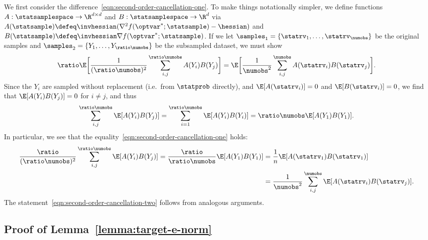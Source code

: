 \documentclass[11pt,twoside]{article}
\theoremstyle{definition}
\begin{document}
  We first consider the difference~\eqref{eqn:second-order-cancellation-one}.
  To make things notationally simpler, we define functions $A
  : \statsamplespace \rightarrow \R^{d \times d}$ and $B : \statsamplespace
  \rightarrow \R^d$ via $A(\statsample) \defeq \invhessian (\nabla^2
  f(\optvar^*; \statsample) - \hessian)$ and $B(\statsample) \defeq \invhessian
  \nabla f(\optvar^*; \statsample)$. If we let $\samples_1 = \{\statrv_1,
  \ldots, \statrv_\numobs\}$ be the original samples and
  $\samples_2 = \{Y_1, \ldots, Y_{\ratio \numobs}\}$ be the subsampled
  dataset, we must show
  \begin{equation*}
    \ratio\E\bigg[\frac{1}{(\ratio \numobs)^2}
      \sum_{i, j}^{\ratio \numobs} A(Y_i) B(Y_j)
      \bigg]
    = \E\bigg[\frac{1}{\numobs^2}
      \sum_{i,j}^\numobs A(\statrv_i) B(\statrv_j)\bigg].
  \end{equation*}
  Since the $Y_i$ are sampled without replacement (i.e.\
  from $\statprob$ directly), and $\E[A(\statrv_i)] =
  0$ and $\E[B(\statrv_i)] = 0$, we find that $\E[A(Y_i) B(Y_j)] = 0$ for
  $i \neq j$, and thus
  \begin{equation*}
    \sum_{i, j}^{\ratio \numobs} \E[A(Y_i) B(Y_j)]
    = \sum_{i=1}^{\ratio \numobs} \E[A(Y_i) B(Y_i)]
    = \ratio \numobs \E[A(Y_1) B(Y_1)].
  \end{equation*}
  In particular, we see that the
  equality~\eqref{eqn:second-order-cancellation-one} holds:
  \begin{align*}
    \frac{\ratio}{(\ratio \numobs)^2}
    \sum_{i,j}^{\ratio \numobs} \E[A(Y_i) B(Y_j)]
    =
    \frac{\ratio}{\ratio \numobs} \E[A(Y_1) B(Y_1)]
    & = \frac{1}{n} \E[A(\statrv_1) B(\statrv_1)] \\
    & = \frac{1}{\numobs^2}
    \sum_{i, j}^\numobs \E[A(\statrv_i) B(\statrv_j)].
  \end{align*}
 The statement~\eqref{eqn:second-order-cancellation-two} follows from
 analogous arguments.



\subsection{Proof of Lemma~\ref{lemma:target-e-norm}}
\label{sec:proof-target-e-norm}
\end{document}
